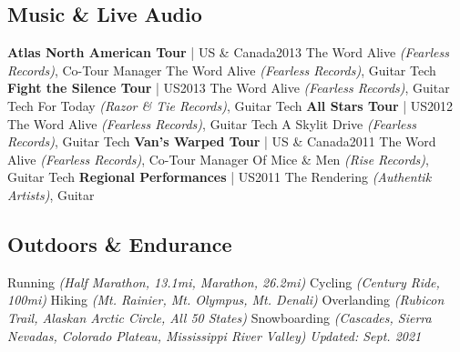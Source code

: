 \documentclass{article}
\begin{document}
    \subsection*{Music \& Live Audio}
        \textbf{Atlas North American Tour} | US \& Canada\hfill{2013}\newline
        The Word Alive \textit{(Fearless Records)}, Co-Tour Manager\newline
        The Word Alive \textit{(Fearless Records)}, Guitar Tech\newline\newline
        \textbf{Fight the Silence Tour} | US\hfill{2013}\newline
        The Word Alive \textit{(Fearless Records)}, Guitar Tech\newline
        For Today \textit{(Razor \& Tie Records)}, Guitar Tech\newline\newline
        \textbf{All Stars Tour} | US\hfill{2012}\newline
        The Word Alive \textit{(Fearless Records)}, Guitar Tech\newline
        A Skylit Drive \textit{(Fearless Records)}, Guitar Tech\newline\newline
        \textbf{Van's Warped Tour} | US \& Canada\hfill{2011}\newline
        The Word Alive \textit{(Fearless Records)}, Co-Tour Manager\newline
        Of Mice \& Men \textit{(Rise Records)}, Guitar Tech\newline\newline
        \textbf{Regional Performances} | US\hfill{2011}\newline
        The Rendering \textit{(Authentik Artists)}, Guitar
    \subsection*{Outdoors \& Endurance}
        Running \textit{(Half Marathon, 13.1mi, Marathon, 26.2mi)}\newline
        Cycling \textit{(Century Ride, 100mi)}\newline
        Hiking \textit{(Mt. Rainier, Mt. Olympus, Mt. Denali)}\newline
        Overlanding \textit{(Rubicon Trail, Alaskan Arctic Circle, All 50 States)}\newline
        Snowboarding \textit{(Cascades, Sierra Nevadas, Colorado Plateau, Mississippi River Valley)}\newline
        \mbox{}
        \vfill
        \hfill{}\textit{Updated: Sept. 2021}
\end{document}
